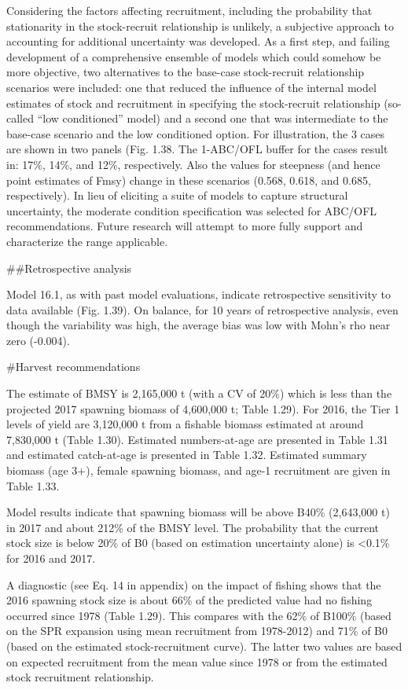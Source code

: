 Considering the factors affecting recruitment, including the probability
that stationarity in the stock-recruit relationship is unlikely, a
subjective approach to accounting for additional uncertainty was
developed. As a first step, and failing development of a comprehensive
ensemble of models which could somehow be more objective, two
alternatives to the base-case stock-recruit relationship scenarios were
included: one that reduced the influence of the internal model estimates
of stock and recruitment in specifying the stock-recruit relationship
(so-called ``low conditioned'' model) and a second one that was
intermediate to the base-case scenario and the low conditioned option.
For illustration, the 3 cases are shown in two panels (Fig. 1.38. The
1-ABC/OFL buffer for the cases result in: 17\%, 14\%, and 12\%,
respectively. Also the values for steepness (and hence point estimates
of Fmsy) change in these scenarios (0.568, 0.618, and 0.685,
respectively). In lieu of eliciting a suite of models to capture
structural uncertainty, the moderate condition specification was
selected for ABC/OFL recommendations. Future research will attempt to
more fully support and characterize the range applicable.

\#\#Retrospective analysis

Model 16.1, as with past model evaluations, indicate retrospective
sensitivity to data available (Fig. 1.39). On balance, for 10 years of
retrospective analysis, even though the variability was high, the
average bias was low with Mohn's rho near zero (-0.004).

\#Harvest recommendations

The estimate of BMSY is 2,165,000 t (with a CV of 20\%) which is less
than the projected 2017 spawning biomass of 4,600,000 t; Table 1.29).
For 2016, the Tier 1 levels of yield are 3,120,000 t from a fishable
biomass estimated at around 7,830,000 t (Table 1.30). Estimated
numbers-at-age are presented in Table 1.31 and estimated catch-at-age is
presented in Table 1.32. Estimated summary biomass (age 3+), female
spawning biomass, and age-1 recruitment are given in Table 1.33.

Model results indicate that spawning biomass will be above B40\%
(2,643,000 t) in 2017 and about 212\% of the BMSY level. The probability
that the current stock size is below 20\% of B0 (based on estimation
uncertainty alone) is \textless{}0.1\% for 2016 and 2017.

A diagnostic (see Eq. 14 in appendix) on the impact of fishing shows
that the 2016 spawning stock size is about 66\% of the predicted value
had no fishing occurred since 1978 (Table 1.29). This compares with the
62\% of B100\% (based on the SPR expansion using mean recruitment from
1978-2012) and 71\% of B0 (based on the estimated stock-recruitment
curve). The latter two values are based on expected recruitment from the
mean value since 1978 or from the estimated stock recruitment
relationship.

